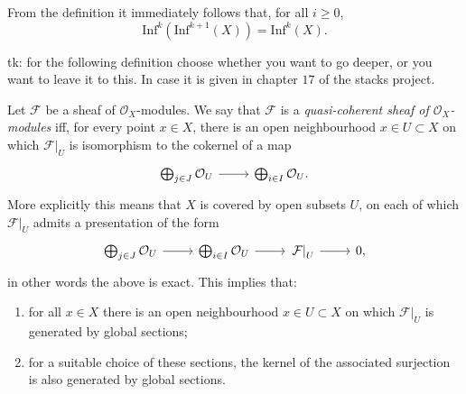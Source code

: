 \documentclass[../Main]{subfiles}
\begin{document}
\begin{rem}[]
	From the definition it immediately follows that, for all $i \geq 0$,
	\begin{equation*}
		\mathrm{Inf}^k ( \mathrm{Inf}^{k+1}(X) ) =
		\mathrm{Inf}^k(X)
	.\end{equation*}
\end{rem}


tk: for the following definition choose whether you want to go deeper, or you want to leave it to this.
In case it is given in chapter $17$ of the stacks project.
\begin{defn}
	Let $\mathcal{F}$ be a sheaf of $\mathcal{O}_{ X }$-modules.
	We say that $\mathcal{F}$ is a {\em quasi-coherent sheaf of $\mathcal{O}_{ X }$-modules}
	iff, for every point $x \in X$, there is an open neighbourhood $x \in U \subset X$
	on which $\left.\mathcal{F}\right|_{U}$ is isomorphism to the cokernel
	of a map
	\begin{equation*}
	\begin{tikzcd}[row sep = 0ex
		,/tikz/column 1/.append style={anchor=base east}
		,/tikz/column 2/.append style={anchor=base west}]
		\bigoplus_{j \in J} \mathcal{O}_{ U } \arrow[r, "", rightarrow] &
		\bigoplus_{i \in I} \mathcal{O}_{ U }
	.\end{tikzcd}
	\end{equation*} 
	More explicitly this means that $X$ is covered by open subsets $U$,
	on each of which $\left.\mathcal{F}\right|_{U}$ admits a presentation
	of the form
	\begin{equation*}
	\begin{tikzcd}[row sep = 0ex]
		\bigoplus_{j \in J} \mathcal{O}_{ U } \arrow[r, "", rightarrow] &
		\bigoplus_{i \in I} \mathcal{O}_{ U } \arrow[r, "", rightarrow] &
		\left.\mathcal{F}\right|_{U} \arrow[r, "", rightarrow] &
		0
	,\end{tikzcd}
	\end{equation*} 
	in other words the above is exact.
	This implies that:
	\begin{enumerate}
		\item for all $x \in X$ there is an open neighbourhood $x \in U \subset X$
			on which $\left.\mathcal{F}\right|_{U}$ is generated by global sections;

		\item for a suitable choice of these sections, the kernel of the associated surjection
			is also generated by global sections.
	\end{enumerate}
\end{defn}
\end{document}
